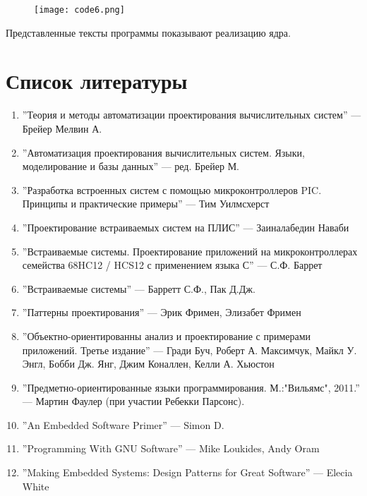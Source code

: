 \documentclass[12pt]{article}
\let\oldsection\section
\renewcommand{\section}[1]{
    \oldsection{#1}
    \setcounter{table}{0}
    \setcounter{figure}{0}
}
\begin{document}
    \newpage

    \begin{figure}[h]
        \texttt{[image: code6.png]}
    \end{figure}

    Представленные тексты программы показывают реализацию ядра.

    \newpage

    \section{Список литературы}

    \begin{enumerate}
        \item ''Теория и методы автоматизации проектирования вычислительных систем'' ---     Брейер Мелвин А.
        \item ''Автоматизация проектирования вычислительных систем. Языки, моделирование и базы данных'' --- ред. Брейер М.
        \item ''Разработка встроенных систем с помощью микроконтроллеров PIC. Принципы и практические примеры'' --- Тим Уилмсхерст
        \item ''Проектирование встраиваемых систем на ПЛИС'' --- Заиналабедин Наваби
        \item ''Встраиваемые системы. Проектирование приложений на микроконтроллерах семейства 68HC12 / HCS12 с применением языка С'' --- С.Ф. Баррет
        \item ''Встраиваемые системы'' --- Барретт С.Ф., Пак Д.Дж.
        \item ''Паттерны проектирования'' --- Эрик Фримен, Элизабет Фримен
        \item ''Объектно-ориентированны анализ и проектирование с примерами приложений. Третье издание'' --- Гради Буч, Роберт А. Максимчук, Майкл У. Энгл, Бобби Дж. Янг, Джим Коналлен, Келли А. Хьюстон
        \item ''Предметно-ориентированные языки программирования.
        М.:"Вильямс", 2011.'' --- Мартин Фаулер (при участии Ребекки Парсонс).
        \item ''An Embedded Software Primer'' --- Simon D.
        \item ''Programming With GNU Software'' --- Mike Loukides, Andy Oram
        \item ''Making Embedded Systems: Design Patterns for Great Software'' --- Elecia White
    \end{enumerate}
\end{document}
